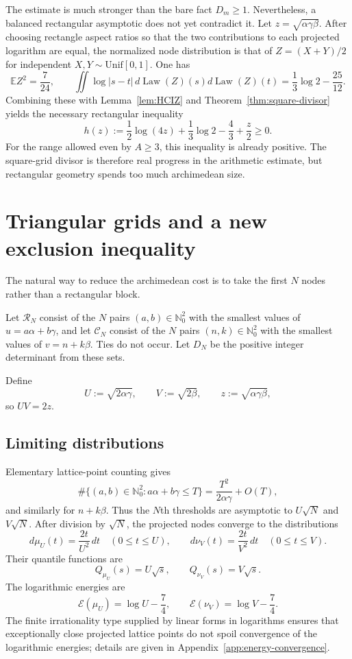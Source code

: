 \documentclass[11pt]{article}
\theoremstyle{definition}
\newcommand{\Nzero}{\mathbb N_0}
\newcommand{\Law}{\operatorname{Law}}
\newcommand{\E}{\mathbb E}
\begin{document}
The estimate is much stronger than the bare fact $D_m\ge1$.  Nevertheless, a
balanced rectangular asymptotic does not yet contradict it.  Let
$z=\sqrt{\alpha\gamma\beta}$.  After choosing rectangle aspect ratios so that
the two contributions to each projected logarithm are equal, the normalized
node distribution is that of
$Z=(X+Y)/2$ for independent $X,Y\sim\mathrm{Unif}[0,1]$.  One has
\[
 \E Z^2=\frac7{24},\qquad
 \iint\log|s-t|\,d\Law(Z)(s)d\Law(Z)(t)
 =\frac13\log2-\frac{25}{12}.
\]
Combining these with Lemma~\ref{lem:HCIZ} and
Theorem~\ref{thm:square-divisor} yields the necessary rectangular inequality
\begin{equation}\label{eq:rectangle-gap}
 h(z):=\frac12\log(4z)+\frac13\log2-\frac43+\frac z2\ge0.
\end{equation}
For the range allowed even by $A\ge3$, this inequality is already positive.
The square-grid divisor is therefore real progress in the arithmetic estimate,
but rectangular geometry spends too much archimedean size.

\section{Triangular grids and a new exclusion inequality}

The natural way to reduce the archimedean cost is to take the first $N$ nodes
rather than a rectangular block.

Let $\mathcal R_N$ consist of the $N$ pairs $(a,b)\in\Nzero^2$ with the
smallest values of $u=a\alpha+b\gamma$, and let $\mathcal C_N$ consist of the
$N$ pairs $(n,k)\in\Nzero^2$ with the smallest values of $v=n+k\beta$.
Ties do not occur.  Let $D_N$ be the positive integer determinant from these
sets.

Define
\[
 U:=\sqrt{2\alpha\gamma},\qquad
 V:=\sqrt{2\beta},\qquad
 z:=\sqrt{\alpha\gamma\beta},
\]
so $UV=2z$.

\subsection{Limiting distributions}

Elementary lattice-point counting gives
\[
 \#\{(a,b)\in\Nzero^2:a\alpha+b\gamma\le T\}
 =\frac{T^2}{2\alpha\gamma}+O(T),
\]
and similarly for $n+k\beta$.  Thus the $N$th thresholds are asymptotic to
$U\sqrt N$ and $V\sqrt N$.  After division by $\sqrt N$, the projected nodes
converge to the distributions
\[
 d\mu_U(t)=\frac{2t}{U^2}\,dt\quad(0\le t\le U),\qquad
 d\nu_V(t)=\frac{2t}{V^2}\,dt\quad(0\le t\le V).
\]
Their quantile functions are
\[
 Q_{\mu_U}(s)=U\sqrt s,\qquad Q_{\nu_V}(s)=V\sqrt s.
\]
The logarithmic energies are
\begin{equation}\label{eq:beta2-energy}
 \mathcal E(\mu_U)=\log U-\frac74,\qquad
 \mathcal E(\nu_V)=\log V-\frac74.
\end{equation}
The finite irrationality type supplied by linear forms in logarithms ensures
that exceptionally close projected lattice points do not spoil convergence of
the logarithmic energies; details are given in
Appendix~\ref{app:energy-convergence}.
\end{document}
